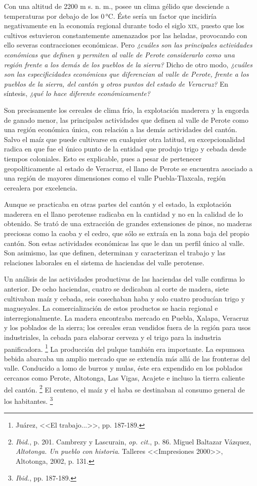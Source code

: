 \documentclass[14pt,twoside,final]{extbook} %
\let\oldfootnote\footnote
\renewcommand\footnote[1]{%
\oldfootnote{\hspace{1mm}#1}}
\begin{document}
Con una altitud de 2200 m s. n. m., posee un clima gélido que desciende a temperaturas por debajo de los 0\,°C. Éste sería un factor que incidiría negativamente en la economía regional durante todo el siglo \textsc{xix}, puesto que los cultivos estuvieron constantemente amenazados por las heladas, provocando con ello severas contracciones económicas. Pero \emph{¿cuáles son las principales
actividades económicas que definen y permiten al valle de Perote considerarlo como una región frente a los demás de los pueblos de la sierra?} Dicho de otro modo, \emph{¿cuáles son las especificidades económicas que diferencian al valle de Perote, frente a los pueblos de la sierra, del cantón y otros puntos del estado de Veracruz?} En síntesis, \emph{¿qué lo hace diferente económicamente?}

Son precisamente los cereales de clima frío, la explotación maderera y la engorda de ganado menor, las principales actividades que definen al valle de Perote como una región económica única, con relación a las demás actividades del cantón. Salvo el maíz que puede cultivarse en cualquier otra latitud, su excepcionalidad radica en que fue el único punto de la entidad que produjo trigo y cebada desde tiempos coloniales. Esto es explicable, pues a pesar de pertenecer geopolíticamente al estado de Veracruz, el llano de Perote se encuentra asociado a una región de mayores dimensiones como el valle Puebla-Tlaxcala, región cerealera por excelencia.

Aunque se practicaba en otras partes del cantón y el estado, la explotación maderera en el llano perotense radicaba en la cantidad y no en la calidad de lo obtenido. Se trató de una extracción de grandes extensiones de pinos, no maderas preciosas como la caoba y el cedro, que sólo se extraía en la zona baja del propio cantón. Son estas actividades económicas las que le dan un perfil único al valle. Son asimismo, las que definen, determinan y caracterizan el trabajo y las relaciones laborales en el sistema de haciendas del valle perotense.

Un análisis de las actividades productivas de las haciendas del valle confirma lo anterior. De ocho haciendas, cuatro se dedicaban al corte de madera, siete cultivaban maíz y cebada, seis cosechaban haba y solo cuatro producían trigo y magueyales. La comercialización de estos productos se hacia regional e interregionalmente. La madera encontraba mercado en Puebla, Xalapa, Veracruz y los poblados de la sierra; los cereales eran vendidos fuera de la región para usos industriales, la cebada para elaborar cerveza y el trigo para la industria panificadora.\footnote{Juárez, <<El trabajo...>>, pp. 187-189.} La producción del pulque también era importante. La espumosa bebida abarcaba un amplio mercado que se extendía más allá de las fronteras del valle. Conducido a lomo de burros y mulas, éste era expendido en los poblados cercanos como Perote, Altotonga, Las Vigas, Acajete e incluso la tierra caliente del cantón.\footnote{\emph{Ibid.}, p. 201. Cambrezy y Lascurain, \emph{op. cit.}, p. 86. Miguel Baltazar Vázquez, \emph{Altotonga. Un pueblo con historia}. Talleres <<Impresiones 2000>>, Altotonga, 2002, p. 131.} El centeno, el maíz y el haba se destinaban al consumo general de los habitantes.\footnote{\emph{Ibid.}, pp. 187-189.}
\end{document}
